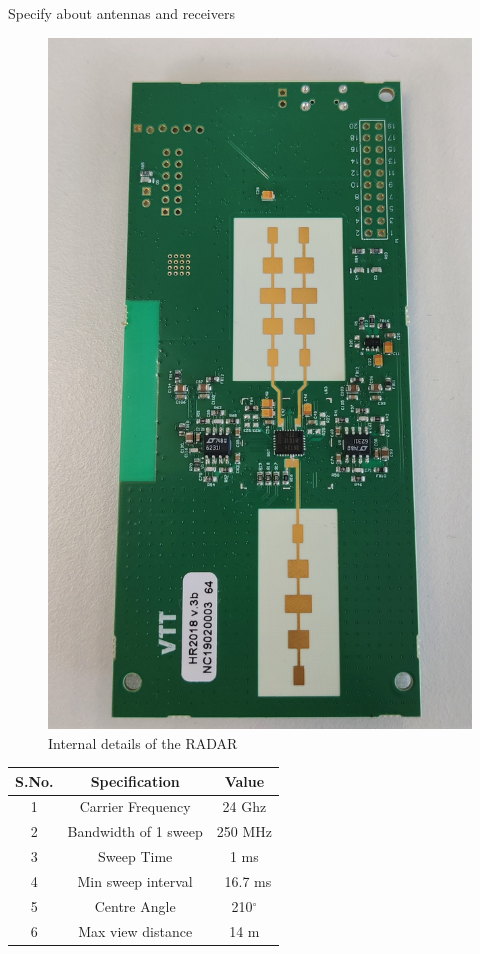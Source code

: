 Specify about antennas and receivers
\begin{figure}[ht]
  \begin{center}
    \includegraphics[scale = 0.08]{Master's thesis/images/Radar_internal.jpg} 
    \caption{Internal details of the RADAR}
    \label{fig:AoA}
  \end{center}
\end{figure}  




\begin{center}
\begin{tabular}{ |c|c|c| }
\hline
 S.No. & Specification & Value \\ 
 \hline
1 &	Carrier Frequency	& 24 Ghz \\
2	& Bandwidth of 1 sweep	& 250 MHz\\
3 &	Sweep Time	& 1 ms\\
4 &	Min sweep interval	& ~16.7 ms\\
5 &	Centre Angle & 210$^{\circ}$  \\
6 &	Max view distance &	14 m \\
 \hline
\end{tabular}
\end{center}

